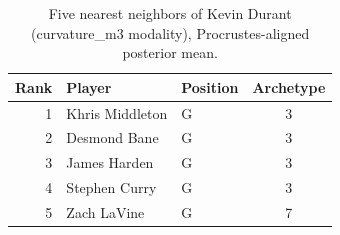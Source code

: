 \begin{table}[htbp]
  \centering\small
  \begin{tabular}{rllc}
    \toprule
    Rank & Player & Position & Archetype \\
    \midrule
    1 & Khris Middleton & G & 3 \\
    2 & Desmond Bane & G & 3 \\
    3 & James Harden & G & 3 \\
    4 & Stephen Curry & G & 3 \\
    5 & Zach LaVine & G & 7 \\
    \bottomrule
  \end{tabular}
  \caption{Five nearest neighbors of Kevin Durant (curvature_m3 modality), Procrustes-aligned posterior mean.}
  \label{tab:Kevin_Durant_neighbors_curvature_m3}
\end{table}

